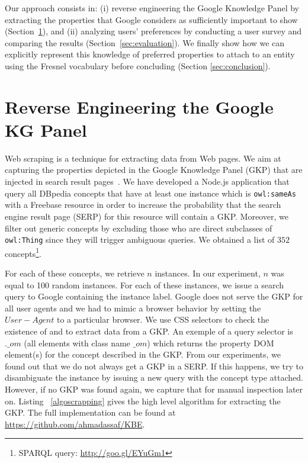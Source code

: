 \documentclass[runningheads,a4paper]{llncs}
\begin{document}
Our approach consists in: (i) reverse engineering the Google Knowledge Panel by extracting the properties that Google considers as sufficiently important to show (Section~\ref{sec:knowledge-graph}), and (ii) analyzing users' preferences by conducting a user survey and comparing the results (Section~\ref{sec:evaluation}). We finally show how we can explicitly represent this knowledge of preferred properties to attach to an entity using the Fresnel vocabulary before concluding (Section \ref{sec:conclusion}).


\section{Reverse Engineering the Google KG Panel}
\label{sec:knowledge-graph}
Web scraping is a technique for extracting data from Web pages. We aim at capturing the properties depicted in the Google Knowledge Panel (GKP) that are injected in search result pages~\cite{Bergman2012}. We have developed a Node.js application that query all DBpedia concepts that have at least one instance which is \texttt{owl:sameAs} with a Freebase resource in order to increase the probability that the search engine result page (SERP) for this resource will contain a GKP. Moreover, we filter out generic concepts by excluding those who are direct subclasses of \texttt{owl:Thing} since they will trigger ambiguous queries. We obtained a list of $352$ concepts\footnote{SPARQL query: \url{http://goo.gl/EYuGm1}}.

For each of these concepts, we retrieve $n$ instances. In our experiment, $n$ was equal to 100 random instances. For each of these instances, we issue a search query to Google containing the instance label. Google does not serve the GKP for all user agents and we had to mimic a browser behavior by setting the $User-Agent$ to a particular browser. We use CSS selectors to check the existence of and to extract data from a GKP. An exemple of a query selector is $.\_om$ (all elements with class name $\_om$) which returns the property DOM element(s) for the concept described in the GKP. From our experiments, we found out that we do not always get a GKP in a SERP. If this happens, we try to disambiguate the instance by issuing a new query with the concept type attached. However, if no GKP was found again, we capture that for manual inspection later on. Listing ~\ref{algoscrapping} gives the high level algorithm for extracting the GKP. The full implementation can be found at \url{https://github.com/ahmadassaf/KBE}.
\end{document}
